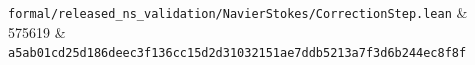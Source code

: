 \documentclass[10pt,a4paper]{article}
\begin{document}
{\begin{longtable}[]
\texttt{f\allowbreak{}o\allowbreak{}r\allowbreak{}m\allowbreak{}a\allowbreak{}l\allowbreak{}/\allowbreak{}r\allowbreak{}e\allowbreak{}l\allowbreak{}e\allowbreak{}a\allowbreak{}s\allowbreak{}e\allowbreak{}d\allowbreak{}\_\allowbreak{}n\allowbreak{}s\allowbreak{}\_\allowbreak{}v\allowbreak{}a\allowbreak{}l\allowbreak{}i\allowbreak{}d\allowbreak{}a\allowbreak{}t\allowbreak{}i\allowbreak{}o\allowbreak{}n\allowbreak{}/\allowbreak{}N\allowbreak{}a\allowbreak{}v\allowbreak{}i\allowbreak{}e\allowbreak{}r\allowbreak{}S\allowbreak{}t\allowbreak{}o\allowbreak{}k\allowbreak{}e\allowbreak{}s\allowbreak{}/\allowbreak{}C\allowbreak{}o\allowbreak{}r\allowbreak{}r\allowbreak{}e\allowbreak{}c\allowbreak{}t\allowbreak{}i\allowbreak{}o\allowbreak{}n\allowbreak{}S\allowbreak{}t\allowbreak{}e\allowbreak{}p\allowbreak{}.\allowbreak{}l\allowbreak{}e\allowbreak{}a\allowbreak{}n} & {}575619 & \texttt{a\allowbreak{}5\allowbreak{}a\allowbreak{}b\allowbreak{}0\allowbreak{}1\allowbreak{}c\allowbreak{}d\allowbreak{}2\allowbreak{}5\allowbreak{}d\allowbreak{}1\allowbreak{}8\allowbreak{}6\allowbreak{}d\allowbreak{}e\allowbreak{}e\allowbreak{}c\allowbreak{}3\allowbreak{}f\allowbreak{}1\allowbreak{}3\allowbreak{}6\allowbreak{}c\allowbreak{}c\allowbreak{}1\allowbreak{}5\allowbreak{}d\allowbreak{}2\allowbreak{}d\allowbreak{}3\allowbreak{}1\allowbreak{}0\allowbreak{}3\allowbreak{}2\allowbreak{}1\allowbreak{}5\allowbreak{}1\allowbreak{}a\allowbreak{}e\allowbreak{}7\allowbreak{}d\allowbreak{}d\allowbreak{}b\allowbreak{}5\allowbreak{}2\allowbreak{}1\allowbreak{}3\allowbreak{}a\allowbreak{}7\allowbreak{}f\allowbreak{}3\allowbreak{}d\allowbreak{}6\allowbreak{}b\allowbreak{}2\allowbreak{}4\allowbreak{}4\allowbreak{}e\allowbreak{}c\allowbreak{}8\allowbreak{}f\allowbreak{}8\allowbreak{}f} \\

\end{longtable}}
\end{document}
